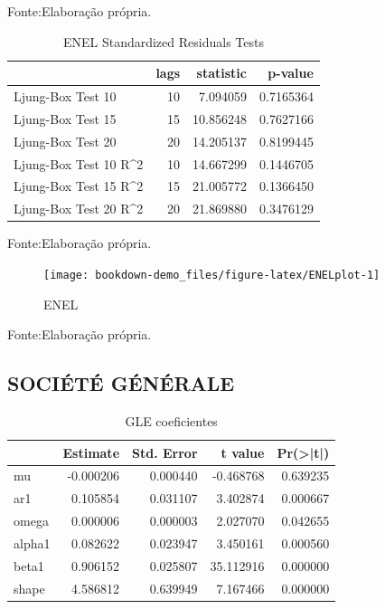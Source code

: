 \documentclass[
  12pt,
  a4paper,
  openany]{book}
\begin{document}
Fonte:Elaboração própria.

\justifying
\bigskip

\begin{table}[!h]

\caption{\label{tab:unnamed-chunk-25}ENEL Standardized Residuals Tests}
\centering
\begin{tabular}[t]{lrrr}
\toprule
  & lags & statistic & p-value\\
\midrule
Ljung-Box Test 10 & 10 & 7.094059 & 0.7165364\\
Ljung-Box Test 15 & 15 & 10.856248 & 0.7627166\\
Ljung-Box Test 20 & 20 & 14.205137 & 0.8199445\\
Ljung-Box Test 10 R\textasciicircum{}2 & 10 & 14.667299 & 0.1446705\\
Ljung-Box Test 15 R\textasciicircum{}2 & 15 & 21.005772 & 0.1366450\\
\addlinespace
Ljung-Box Test 20 R\textasciicircum{}2 & 20 & 21.869880 & 0.3476129\\
\bottomrule
\end{tabular}
\end{table}
\FloatBarrier
\centering

Fonte:Elaboração própria.

\justifying
\bigskip
\begin{figure}

{\centering \texttt{[image: bookdown-demo\_files/figure-latex/ENELplot-1]} 

}

\caption{ENEL}\label{fig:ENELplot}
\end{figure}
\FloatBarrier
\centering

Fonte:Elaboração própria.

\justifying
\bigskip

\hypertarget{sociuxe9tuxe9-guxe9nuxe9rale}{%
\subsection{SOCIÉTÉ GÉNÉRALE}\label{sociuxe9tuxe9-guxe9nuxe9rale}}

\begin{table}[!h]

\caption{\label{tab:unnamed-chunk-27}GLE coeficientes}
\centering
\begin{tabular}[t]{lrrrr}
\toprule
  &  Estimate &  Std. Error &  t value & Pr(>|t|)\\
\midrule
mu & -0.000206 & 0.000440 & -0.468768 & 0.639235\\
ar1 & 0.105854 & 0.031107 & 3.402874 & 0.000667\\
omega & 0.000006 & 0.000003 & 2.027070 & 0.042655\\
alpha1 & 0.082622 & 0.023947 & 3.450161 & 0.000560\\
beta1 & 0.906152 & 0.025807 & 35.112916 & 0.000000\\
\addlinespace
shape & 4.586812 & 0.639949 & 7.167466 & 0.000000\\
\bottomrule
\end{tabular}
\end{table}
\FloatBarrier
\centering
\end{document}
